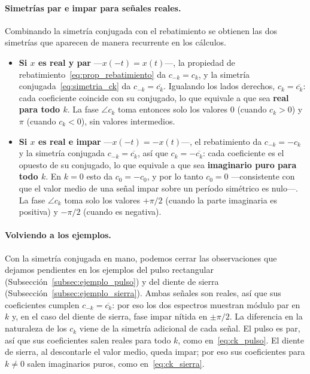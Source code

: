 \documentclass[class=book, crop=false]{standalone}
\begin{document}
\paragraph{Simetrías par e impar para señales reales.}
Combinando la simetría conjugada con el rebatimiento se obtienen
las dos simetrías que aparecen de manera recurrente en los cálculos.
\begin{itemize}[leftmargin=*]
    \item \textbf{Si $x$ es real y par} ---$x(-t) = x(t)$---, la
          propiedad de rebatimiento~\eqref{eq:prop_rebatimiento} da
          $c_{-k} = c_k$, y la simetría
          conjugada~\eqref{eq:simetria_ck} da
          $c_{-k} = \overline{c_k}$. Igualando los lados derechos,
          $c_k = \overline{c_k}$: cada coeficiente coincide con su
          conjugado, lo que equivale a que sea \textbf{real para
          todo $k$}. La fase $\angle c_k$ toma entonces solo los
          valores $0$ (cuando $c_k > 0$) y $\pi$ (cuando $c_k < 0$),
          sin valores intermedios.
    \item \textbf{Si $x$ es real e impar} ---$x(-t) = -x(t)$---, el
          rebatimiento da $c_{-k} = -c_k$ y la simetría conjugada
          $c_{-k} = \overline{c_k}$, así que $c_k = -\overline{c_k}$:
          cada coeficiente es el opuesto de su conjugado, lo que
          equivale a que sea \textbf{imaginario puro para todo $k$}.
          En $k=0$ esto da $c_0 = -c_0$, y por lo tanto $c_0 = 0$
          ---consistente con que el valor medio de una señal impar
          sobre un período simétrico es nulo---. La fase $\angle c_k$
          toma solo los valores $+\pi/2$ (cuando la parte imaginaria
          es positiva) y $-\pi/2$ (cuando es negativa).
\end{itemize}

\paragraph{Volviendo a los ejemplos.}
Con la simetría conjugada en mano, podemos cerrar las observaciones
que dejamos pendientes en los ejemplos del pulso rectangular
(Subsección~\ref{subsec:ejemplo_pulso}) y del diente de sierra
(Subsección~\ref{subsec:ejemplo_sierra}). Ambas señales son reales,
así que sus coeficientes cumplen $c_{-k} = \overline{c_k}$: por eso
los dos espectros muestran módulo par en $k$ y, en el caso del
diente de sierra, fase impar nítida en $\pm\pi/2$. La diferencia
en la naturaleza de los $c_k$ viene de la simetría adicional de
cada señal. El pulso es par, así que sus coeficientes salen reales
para todo $k$, como en~\eqref{eq:ck_pulso}. El diente de sierra, al descontarle el valor medio,
queda impar; por eso sus coeficientes para $k\neq 0$ salen
imaginarios puros, como en~\eqref{eq:ck_sierra}.
\end{document}
